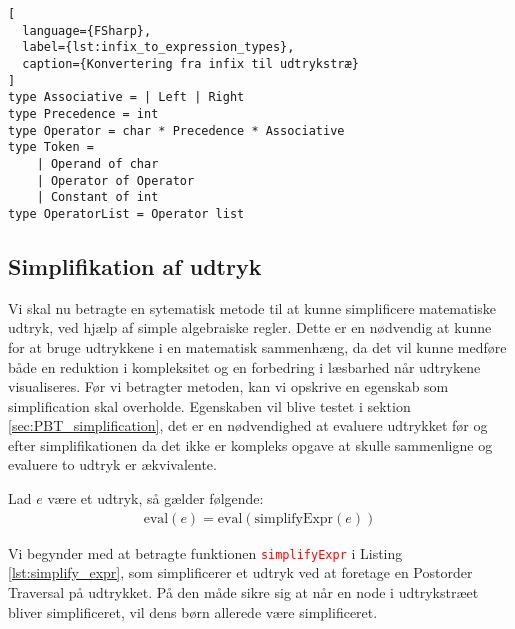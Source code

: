 \begin{lstlisting}[
  language={FSharp}, 
  label={lst:infix_to_expression_types}, 
  caption={Konvertering fra infix til udtrykstræ}
]
type Associative = | Left | Right
type Precedence = int
type Operator = char * Precedence * Associative
type Token =
    | Operand of char
    | Operator of Operator
    | Constant of int
type OperatorList = Operator list
\end{lstlisting}




\subsection{Simplifikation af udtryk} \label{sec:simplification_expression}
Vi skal nu betragte en sytematisk metode til at kunne simplificere matematiske udtryk, ved hjælp af simple algebraiske regler. Dette er en nødvendig at kunne for at bruge udtrykkene i en matematisk sammenhæng, da det vil kunne medføre både en reduktion i kompleksitet og en forbedring i læsbarhed når udtrykene visualiseres. Før vi betragter metoden, kan vi opskrive en egenskab som simplification skal overholde. Egenskaben vil blive testet i sektion \ref{sec:PBT_simplification}, det er en nødvendighed at evaluere udtrykket før og efter simplifikationen da det ikke er kompleks opgave at skulle sammenligne og evaluere to udtryk er ækvivalente.
\vspace{0.5cm}
\begin{egenskab}\label{egenskab:simplification}
Lad $e$ være et udtryk, så gælder følgende:
\begin{align*}
  \text{eval}(e) = \text{eval}(\text{simplifyExpr}(e))
\end{align*}
\end{egenskab}

Vi begynder med at betragte funktionen \textcolor{red}{\texttt{simplifyExpr}} i Listing \ref{lst:simplify_expr}, som simplificerer et udtryk ved at foretage en Postorder Traversal på udtrykket. På den måde sikre sig at når en node i udtrykstræet bliver simplificeret, vil dens børn allerede være simplificeret. 

